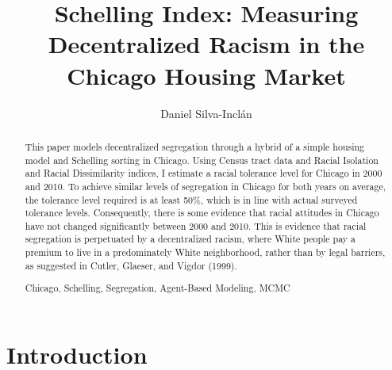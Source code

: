 \documentclass[11pt]{asaproc}
\title{Schelling Index: Measuring Decentralized Racism in the Chicago Housing Market}
\author{Daniel Silva-Incl\'{a}n}
\newcommand{\1}{\mathbb{1}}
\begin{document}
\maketitle

\begin{abstract}
This paper models decentralized segregation through a hybrid of a simple housing model and Schelling sorting in Chicago. Using Census tract data and Racial Isolation and Racial Dissimilarity indices, I estimate a racial tolerance level for Chicago in 2000 and 2010. To achieve similar levels of segregation in Chicago for both years on average, the tolerance level required is at least 50\%, which is in line with actual surveyed tolerance levels.  Consequently, there is some evidence that racial attitudes in Chicago have not changed significantly between 2000 and 2010. This is evidence that racial segregation is perpetuated by a decentralized racism, where White people pay a premium to live in a predominately White neighborhood, rather than by legal barriers, as suggested in Cutler, Glaeser, and Vigdor (1999).
\begin{keywords}
Chicago, Schelling, Segregation, Agent-Based Modeling, MCMC
\end{keywords}
\end{abstract}



\section{Introduction\label{intro}}
\end{document}
